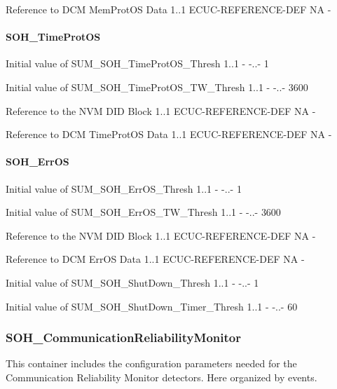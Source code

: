 {
{Reference to DCM MemProtOS Data}
{1..1}
{ECUC-REFERENCE-DEF}
{NA}
{-}}

\paragraph{SOH_TimeProtOS}
{
{Initial value of SUM_SOH_TimeProtOS_Thresh}
{1..1}
{-}
{-..-}
{1}}

{
{Initial value of SUM_SOH_TimeProtOS_TW_Thresh}
{1..1}
{-}
{-..-}
{3600}}

{
{Reference to the NVM DID Block}
{1..1}
{ECUC-REFERENCE-DEF}
{NA}
{-}}

{
{Reference to DCM TimeProtOS Data}
{1..1}
{ECUC-REFERENCE-DEF}
{NA}
{-}}

\paragraph{SOH_ErrOS}
{
{Initial value of SUM_SOH_ErrOS_Thresh}
{1..1}
{-}
{-..-}
{1}}

{
{Initial value of SUM_SOH_ErrOS_TW_Thresh}
{1..1}
{-}
{-..-}
{3600}}

{
{Reference to the NVM DID Block}
{1..1}
{ECUC-REFERENCE-DEF}
{NA}
{-}}

{
{Reference to DCM ErrOS Data}
{1..1}
{ECUC-REFERENCE-DEF}
{NA}
{-}}

{
{Initial value of SUM_SOH_ShutDown_Thresh}
{1..1}
{-}
{-..-}
{1}}

{
{Initial value of SUM_SOH_ShutDown_Timer_Thresh}
{1..1}
{-}
{-..-}
{60}}


\subsubsection{SOH_CommunicationReliabilityMonitor}
This container includes the configuration parameters needed for the Communication Reliability Monitor detectors. Here organized by events.

